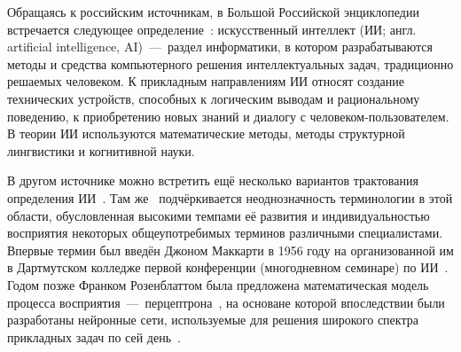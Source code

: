 Обращаясь к российским источникам, в Большой Российской энциклопедии встречается следующее определение~\cite{osipov}: искусственный интеллект (ИИ; англ. artificial intelligence, AI)~---~раздел информатики, в котором разрабатываются методы и средства компьютерного решения интеллектуальных задач, традиционно решаемых человеком. К прикладным направлениям ИИ относят создание технических устройств, способных к логическим выводам и рациональному поведению, к приобретению новых знаний и диалогу с человеком-пользователем. В теории ИИ используются математические методы, методы структурной лингвистики и когнитивной науки. 

В другом источнике можно встретить ещё несколько вариантов трактования определения ИИ~\cite[с.~247]{averkin}. Там же~\cite[с.~245]{averkin} подчёркивается неоднозначность терминологии в этой области, обусловленная высокими темпами её развития и индивидуальностью восприятия некоторых общеупотребимых терминов различными специалистами. Впервые термин был введён Джоном Маккарти в 1956 году на организованной им в Дартмутском колледже первой конференции (многодневном семинаре) по ИИ~\cite{osipov}. Годом позже Франком Розенблаттом была предложена математическая модель процесса восприятия~---~перцептрона~\cite{rosenblatt}, на основане которой впоследствии были разработаны нейронные сети, используемые для решения широкого спектра прикладных задач по сей день~\cite{skansi, nikolenko, trask, goodfellow, sharifani, sarkerdl}. 

